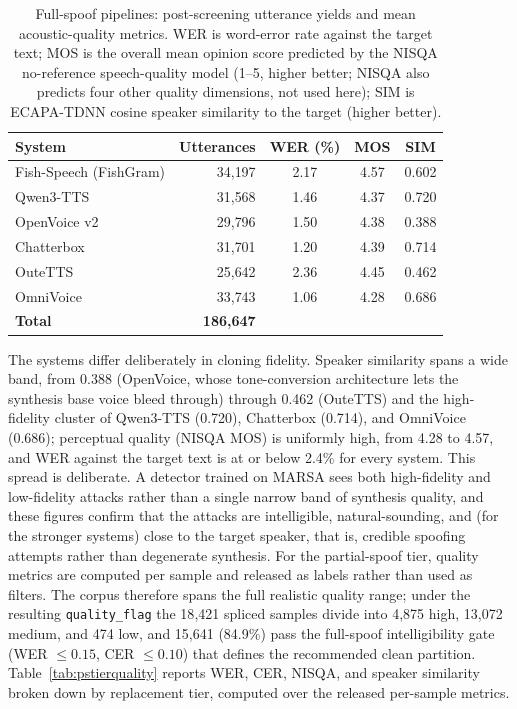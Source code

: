 \documentclass[11pt]{article}
\begin{document}
\begin{table}[t]
\centering
\caption{Full-spoof pipelines: post-screening utterance yields and mean
acoustic-quality metrics. WER is word-error rate against the target
text; MOS is the overall mean opinion score predicted by the NISQA
no-reference speech-quality model \citep{nisqa} (1--5, higher better;
NISQA also predicts four other quality dimensions, not used here); SIM
is ECAPA-TDNN cosine speaker similarity to the target (higher better).}
\label{tab:fullspoof}
\small
\begin{tabular}{lrccc}
\toprule
\textbf{System} & \textbf{Utterances} & \textbf{WER (\%)} & \textbf{MOS} & \textbf{SIM} \\
\midrule
Fish-Speech (FishGram) & 34{,}197 & 2.17 & 4.57 & 0.602 \\
Qwen3-TTS              & 31{,}568 & 1.46 & 4.37 & 0.720 \\
OpenVoice v2           & 29{,}796 & 1.50 & 4.38 & 0.388 \\
Chatterbox             & 31{,}701 & 1.20 & 4.39 & 0.714 \\
OuteTTS                & 25{,}642 & 2.36 & 4.45 & 0.462 \\
OmniVoice              & 33{,}743 & 1.06 & 4.28 & 0.686 \\
\midrule
\textbf{Total}         & \textbf{186{,}647} & & & \\
\bottomrule
\end{tabular}
\end{table}

The systems differ deliberately in cloning fidelity. Speaker similarity
spans a wide band, from 0.388 (OpenVoice, whose tone-conversion
architecture lets the synthesis base voice bleed through) through 0.462
(OuteTTS) and the high-fidelity cluster of Qwen3-TTS (0.720), Chatterbox
(0.714), and OmniVoice (0.686); perceptual quality (NISQA MOS) is
uniformly high, from 4.28 to 4.57, and WER against the target text is at or below
2.4\% for every system. This spread is deliberate. A detector trained on
MARSA sees both high-fidelity and low-fidelity attacks rather than a
single narrow band of synthesis quality, and these figures confirm that
the attacks are intelligible, natural-sounding, and (for the stronger
systems) close to the target speaker, that is, credible spoofing
attempts rather than degenerate synthesis. For the partial-spoof tier, quality metrics
are computed per sample and released as labels rather than used as
filters. The corpus therefore spans the full realistic quality range;
under the resulting \texttt{quality\_flag} the 18{,}421 spliced samples
divide into 4{,}875 high, 13{,}072 medium, and 474 low, and 15{,}641
(84.9\%) pass the full-spoof intelligibility gate (WER $\leq 0.15$,
CER $\leq 0.10$) that defines the recommended clean partition.
Table~\ref{tab:pstierquality} reports WER, CER, NISQA, and speaker
similarity broken down by replacement tier, computed over the released
per-sample metrics.
\end{document}
